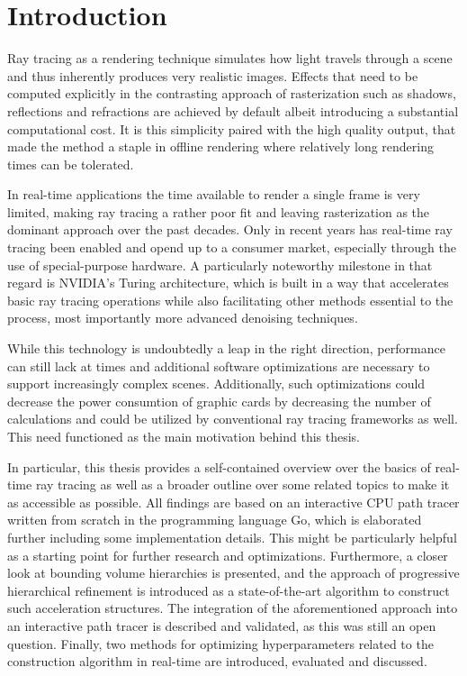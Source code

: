 \section{Introduction}
Ray tracing as a rendering technique simulates how light travels through a scene and thus inherently produces very realistic images. Effects that need to be computed explicitly in the contrasting approach of rasterization such as shadows, reflections and refractions are achieved by default albeit introducing a substantial computational cost. It is this simplicity paired with the high quality output, that made the method a staple in offline rendering where relatively long rendering times can be tolerated.

In real-time applications the time available to render a single frame is very limited, making ray tracing a rather poor fit and leaving rasterization as the dominant approach over the past decades. Only in recent years has real-time ray tracing been enabled and opend up to a consumer market, especially through the use of special-purpose hardware. A particularly noteworthy milestone in that regard is NVIDIA's Turing architecture\cite{nvidia2017turing}, which is built in a way that accelerates basic ray tracing operations while also facilitating other methods essential to the process, most importantly more advanced denoising techniques. 

While this technology is undoubtedly a leap in the right direction, performance can still lack at times and additional software optimizations are necessary to support increasingly complex scenes. Additionally, such optimizations could decrease the power consumtion of graphic cards by decreasing the number of calculations and could be utilized by conventional ray tracing frameworks as well. This need functioned as the main motivation behind this thesis.

In particular, this thesis provides a self-contained overview over the basics of real-time ray tracing as well as a broader outline over some related topics to make it as accessible as possible. All findings are based on an interactive CPU path tracer written from scratch in the programming language Go, which is elaborated further including some implementation details. This might be particularly helpful as a starting point for further research and optimizations. Furthermore, a closer look at bounding volume hierarchies is presented, and the approach of progressive hierarchical refinement\cite{hendrich_parallel_2017} is introduced as a state-of-the-art algorithm to construct such acceleration structures. The integration of the aforementioned approach into an interactive path tracer is described and validated, as this was still an open question. Finally, two methods for optimizing hyperparameters related to the construction algorithm in real-time are introduced, evaluated and discussed.